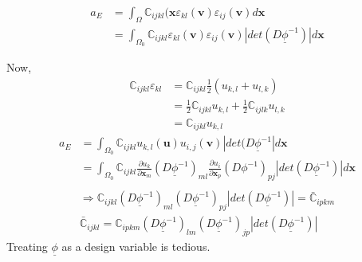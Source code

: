 \documentclass[10pt]{article}
\begin{document}
\begin{equation}
\begin{split}
a_E &=\int_\Omega \mathbb{C}_{ijkl}(\textbf{x}\varepsilon_{kl}(\textbf{v})\varepsilon_{ij}(\textbf{v})d\textbf{x}\\
&=\int_{\Omega_0} \mathbb{C}_{ijkl}\varepsilon_{kl}(\textbf{v})\varepsilon_{ij}(\textbf{v})|det(D\underline{\phi}^{-1})|d\textbf{x}
\end{split}
\end{equation}

Now,
\begin{equation}	\label{compliance}
\begin{split}
\mathbb{C}_{ijkl} \varepsilon_{kl} &= \mathbb{C}_{ijkl}\frac{1}{2}(u_{k,l}+u_{l,k})\\
 & =\frac{1}{2}\mathbb{C}_{ijkl}u_{k,l}+\frac{1}{2}\mathbb{C}_{ijlk}u_{l,k}\\
 & =\mathbb{C}_{ijkl}u_{k,l}
\end{split}
\end{equation}
\begin{equation}
\begin{split}
a_E &= \int_{\Omega_0}\mathbb{C}_{ijkl}u_{k,l}(\textbf{u})u_{i,j}(\textbf{v})|det(D\underline{\phi}^{-1}|d\textbf{x}\\
&= \int_{\Omega_0}\mathbb{C}_{ijkl}\frac{\partial u_k}{\partial\textbf{x}_m}(D\underline{\phi}^{-1})_{ml}\frac{\partial u_i}{\partial \textbf{x}_p}(D\phi^{-1})_{pj}|det(D\underline{\phi}^{-1})|d\textbf{x}\\
\end{split}
\end{equation}
\begin{eqnarray}
\Rightarrow \mathbb{C}_{ijkl}(D\underline{\phi}^{-1})_{ml}(D\underline{\phi}^{-1})_{pj}|det(D\underline{\phi}^{-1})| = \bar{\mathbb{C}}_{ipkm}\\
\bar{\mathbb{C}}_{ijkl} = \mathbb{C}_{ipkm}(D\underline{\phi}^{-1})_{lm}(D\underline{\phi}^{-1})_{jp}|det(D\underline{\phi}^{-1})|
\end{eqnarray}
Treating $\underline{\phi}$ as a design variable is tedious.
\end{document}
